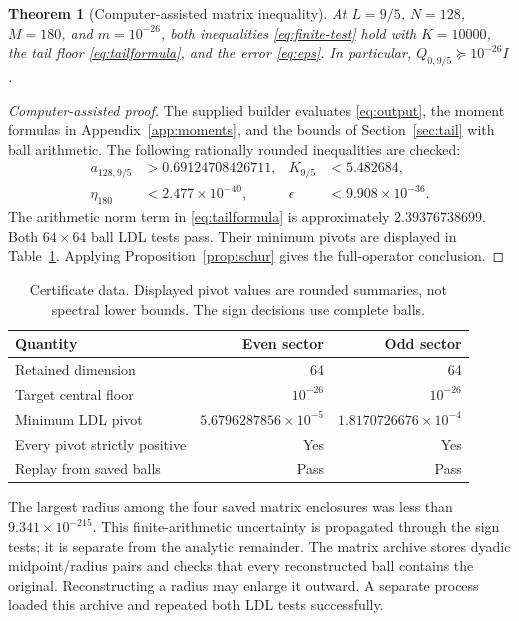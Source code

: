 \documentclass[11pt]{article}
\numberwithin{equation}{section}
\newtheorem{theorem}{Theorem}[section]
\theoremstyle{definition}
\theoremstyle{remark}
\begin{document}
\begin{theorem}[Computer-assisted matrix inequality]\label{thm:computation}
At $L=9/5$, $N=128$, $M=180$, and $m=10^{-26}$, both inequalities
\eqref{eq:finite-test} hold with $K=10000$, the tail floor
\eqref{eq:tailformula}, and the error \eqref{eq:eps}.
In particular, $Q_{0,9/5}\succeq10^{-26}I$.
\end{theorem}
\begin{proof}[Computer-assisted proof]
The supplied builder evaluates \eqref{eq:output}, the moment formulas in
Appendix~\ref{app:moments}, and the bounds of Section~\ref{sec:tail} with
ball arithmetic. The following rationally rounded inequalities are checked:
\begin{align*}
 a_{128,9/5}&>0.69124708426711,&K_{9/5}&<5.482684,\\
 \eta_{180}&<2.477\times10^{-40},&
 \epsilon&<9.908\times10^{-36}.
\end{align*}
The arithmetic norm term in \eqref{eq:tailformula} is approximately
$2.39376738699$. Both $64\times64$ ball LDL tests pass. Their minimum
pivots are displayed in Table~\ref{tab:certificate}. Applying
Proposition~\ref{prop:schur} gives the full-operator conclusion.
\end{proof}

\begin{table}[ht]
\centering
\caption{Certificate data. Displayed pivot values are rounded summaries,
not spectral lower bounds. The sign decisions use complete balls.}
\label{tab:certificate}
\begin{tabular}{@{}lrr@{}}
\toprule
Quantity & Even sector & Odd sector\\
\midrule
Retained dimension & 64 & 64\\
Target central floor & $10^{-26}$ & $10^{-26}$\\
Minimum LDL pivot & $5.6796287856\times10^{-5}$ & $1.8170726676\times10^{-4}$\\
Every pivot strictly positive & Yes & Yes\\
Replay from saved balls & Pass & Pass\\
\bottomrule
\end{tabular}
\end{table}

The largest radius among the four saved matrix enclosures was less than
$9.341\times10^{-215}$. This finite-arithmetic uncertainty is propagated
through the sign tests; it is separate from the analytic remainder.
The matrix archive stores dyadic midpoint/radius pairs and checks that every
reconstructed ball contains the original. Reconstructing a radius may enlarge
it outward. A separate process loaded this archive and repeated both LDL
tests successfully.
\end{document}
